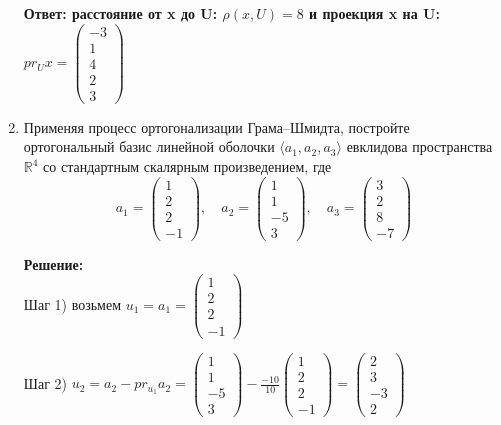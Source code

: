 \documentclass[a4paper,12pt]{article}
\begin{document}
\begin{enumerate}
\textbf{Ответ: расстояние от x до U: $\rho(x,U) =8$ и проекция x на U: $pr_{U}x= \begin{pmatrix}
-3\\1\\4\\2\\3
\end{pmatrix} $ }

\item Применяя процесс ортогонализации Грама--Шмидта, постройте ортогональный базис линейной оболочки  $\langle a_1,a_2,a_3\rangle$ евклидова пространства $\mathbb R^4$ со стандартным скалярным произведением, где
\[
a_1=
\begin{pmatrix}
{1}\\{2}\\{2}\\{-1}
\end{pmatrix}
,\quad
a_2=
\begin{pmatrix}
{1}\\{1}\\{-5}\\{3}
\end{pmatrix}
,\quad
a_3=
\begin{pmatrix}
{3}\\{2}\\{8}\\{-7}
\end{pmatrix}
\]
\vspace{5pt}

\textbf{Решение:}\\
Шаг 1) возьмем  $u_1 = a_1=\begin{pmatrix}
{1}\\{2}\\{2}\\{-1}
\end{pmatrix}$

Шаг 2) $u_2 = a_2 - pr_{u_1}a_2= \begin{pmatrix}
{1}\\{1}\\{-5}\\{3}
\end{pmatrix} - \frac{-10}{10} \begin{pmatrix}
{1}\\{2}\\{2}\\{-1}
\end{pmatrix} = \begin{pmatrix}
{2}\\{3}\\{-3}\\{2}
\end{pmatrix}$


\end{enumerate}
\end{document}
